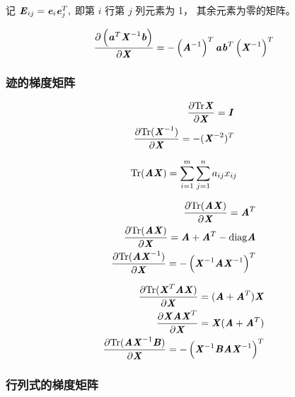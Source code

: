 记 $\ME_{ij} = \Ve_i \Ve_j^T,$ 即第 $i$ 行第 $j$ 列元素为 1， 其余元素为零的矩阵。

\[
    \frac{\partial \left( \Va^T \MX^{-1} \Vb\right)}{\partial \MX} = -\left(\MA^{-1}\right)^T \Va \Vb^T \left(\MX^{-1}\right)^T
\]

\subsubsection{迹的梯度矩阵}
\label{ssub:迹的梯度矩阵}

\begin{theorem}
    \[
        \begin{aligned}
            \frac{\partial \Tr \MX}{\partial \MX } = \MI \\
            \frac{\partial \Tr (\MX^{-1})}{\partial \MX} = -(\MX^{-2})^T
        \end{aligned}
    \]
\end{theorem}

 \[
     \Tr(\MA\MX) = \sum_{i = 1}^m \sum_{j = 1}^n a_{ij} x_{ij}
 \]

\begin{theorem}
    \[
        \begin{aligned}
            \frac{\partial \Tr(\MA \MX)}{\partial \MX} = \MA^T \\
            \frac{\partial \Tr (\MA\MX)}{\partial\MX} = \MA + \MA^T - \mathrm{diag}\MA \\
            \frac{\partial \Tr(\MA \MX^{-1})}{\partial \MX} = - \left(\MX^{-1} \MA \MX^{-1}\right)^T
        \end{aligned}
    \]
\end{theorem}

\begin{theorem}
    \[
        \begin{aligned}
            \frac{\partial \Tr(\MX^T \MA \MX)}{\partial \MX} = (\MA + \MA^T) \MX \\
            \frac{\partial \MX \MA \MX^T}{\partial \MX} = \MX (\MA + \MA^T) \\
            \frac{\partial \Tr(\MA \MX^{-1} \MB)}{\partial \MX} = -\left(\MX^{-1} \MB \MA \MX^{-1}\right)^T
        \end{aligned}
    \]
\end{theorem}

\subsubsection{行列式的梯度矩阵}
\label{ssub:行列式的梯度矩阵}

